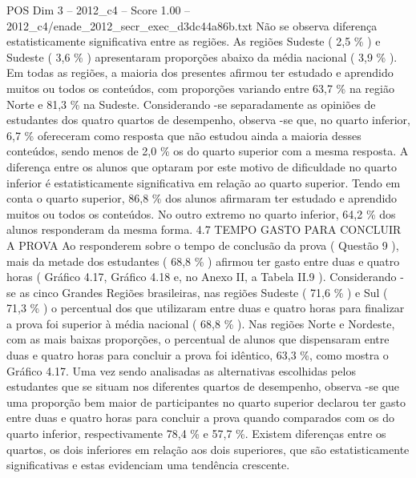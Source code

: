 \begin{textsample}{POS Dim 3 – 2012\_c4 – Score 1.00 – 2012\_c4/enade\_2012\_secr\_exec\_d3dc44a86b.txt}
Não se observa diferença estatisticamente significativa entre as regiões.
As regiões Sudeste ( 2,5 \% ) e Sudeste ( 3,6 \% ) apresentaram proporções abaixo da média nacional ( 3,9 \% ).
Em todas as regiões, a maioria dos presentes afirmou ter estudado e aprendido muitos ou todos os conteúdos, com proporções variando entre 63,7 \% na região Norte e 81,3 \% na Sudeste.
Considerando -se separadamente as opiniões de estudantes dos quatro quartos de desempenho, observa -se que, no quarto inferior, 6,7 \% ofereceram como resposta que não estudou ainda a maioria desses conteúdos, sendo menos de 2,0 \% os do quarto superior com a mesma resposta.
A diferença entre os alunos que optaram por este motivo de dificuldade no quarto inferior é estatisticamente significativa em relação ao quarto superior.
Tendo em conta o quarto superior, 86,8 \% dos alunos afirmaram ter estudado e aprendido muitos ou todos os conteúdos.
No outro extremo no quarto inferior, 64,2 \% dos alunos responderam da mesma forma. 4.7 TEMPO GASTO PARA CONCLUIR A PROVA Ao responderem sobre o tempo de conclusão da prova ( Questão 9 ), mais da metade dos estudantes ( 68,8 \% ) afirmou ter gasto entre duas e quatro horas ( Gráfico 4.17, Gráfico 4.18 e, no Anexo II, a Tabela II.9 ).
Considerando -se as cinco Grandes Regiões brasileiras, nas regiões Sudeste ( 71,6 \% ) e Sul ( 71,3 \% ) o percentual dos que utilizaram entre duas e quatro horas para finalizar a prova foi superior à média nacional ( 68,8 \% ).
Nas regiões Norte e Nordeste, com as mais baixas proporções, o percentual de alunos que dispensaram entre duas e quatro horas para concluir a prova foi idêntico, 63,3 \%, como mostra o Gráfico 4.17.
Uma vez sendo analisadas as alternativas escolhidas pelos estudantes que se situam nos diferentes quartos de desempenho, observa -se que uma proporção bem maior de participantes no quarto superior declarou ter gasto entre duas e quatro horas para concluir a prova quando comparados com os do quarto inferior, respectivamente 78,4 \% e 57,7 \%.
Existem diferenças entre os quartos, os dois inferiores em relação aos dois superiores, que são estatisticamente significativas e estas evidenciam uma tendência crescente.

\end{textsample}
